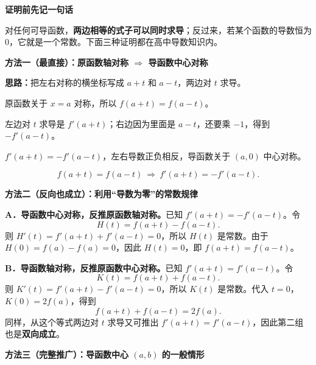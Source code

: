 \begin{proofbox}
  \textbf{\textcolor{CProof}{证明前先记一句话}}\par\nopagebreak[4]

  对任何可导函数，\textbf{两边相等的式子可以同时求导}；反过来，若某个函数的导数恒为 $0$，它就是一个常数。下面三种证明都在高中导数知识内。

  \medskip
  \textbf{\textcolor{CProof}{方法一（最直接）：原函数轴对称 $\Longrightarrow$ 导函数中心对称}}\par\nopagebreak[4]

  \textbf{思路：}把左右对称的横坐标写成 $a+t$ 和 $a-t$，两边对 $t$ 求导。
  \begin{description}[style=nextline,leftmargin=2.8em,labelsep=0.5em,itemsep=0.35em]
    \item[\textbf{第一步（写出“同高”）：}] 原函数关于 $x=a$ 对称，所以 $f(a+t)=f(a-t)$。
    \item[\textbf{第二步（分别求导）：}] 左边对 $t$ 求导是 $f'(a+t)$；右边因为里面是 $a-t$，还要乘 $-1$，得到 $-f'(a-t)$。
    \item[\textbf{第三步（读出对称）：}] $f'(a+t)=-f'(a-t)$，左右导数正负相反，导函数关于 $(a,0)$ 中心对称。
  \end{description}
  \[
    \boxed{f(a+t)=f(a-t)\ \Longrightarrow\ f'(a+t)=-f'(a-t).}
  \]
  \begin{center}
  
  \end{center}

  \medskip
  \textbf{\textcolor{CProof}{方法二（反向也成立）：利用“导数为零”的常数规律}}\par\nopagebreak[4]

  \textbf{A．导函数中心对称，反推原函数轴对称。}已知 $f'(a+t)=-f'(a-t)$。令
  \[
    H(t)=f(a+t)-f(a-t).
  \]
  则 $H'(t)=f'(a+t)+f'(a-t)=0$，所以 $H(t)$ 是常数。由于 $H(0)=f(a)-f(a)=0$，因此 $H(t)=0$，即 $f(a+t)=f(a-t)$。

  \textbf{B．导函数轴对称，反推原函数中心对称。}已知 $f'(a+t)=f'(a-t)$。令
  \[
    K(t)=f(a+t)+f(a-t).
  \]
  则 $K'(t)=f'(a+t)-f'(a-t)=0$，所以 $K(t)$ 是常数。代入 $t=0$，$K(0)=2f(a)$，得到
  \[
    \boxed{f(a+t)+f(a-t)=2f(a).}
  \]
  同样，从这个等式两边对 $t$ 求导又可推出 $f'(a+t)=f'(a-t)$，因此第二组也是\textbf{双向成立}。
  \begin{center}
  
  \end{center}

  \medskip
  \textbf{\textcolor{CProof}{方法三（完整推广）：导函数中心 $(a,b)$ 的一般情形}}\par\nopagebreak[4]


\end{proofbox}
